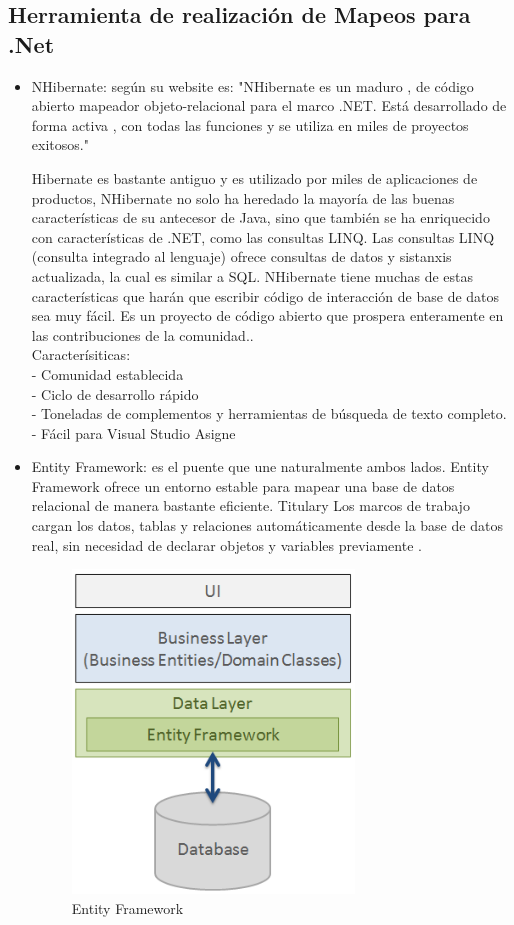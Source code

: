 \documentclass[preprint,12pt]{elsarticle}
\begin{document}
\subsection{\textbf{Herramienta de realización de Mapeos para .Net}}
\begin{itemize}
	\item NHibernate: según su website es: "NHibernate es un maduro , de código abierto mapeador objeto-relacional para el marco .NET. Está desarrollado de forma activa , con todas las funciones y se utiliza en miles de proyectos exitosos."\cite{nhibernate}

Hibernate es bastante antiguo y es utilizado por miles de aplicaciones de productos, NHibernate no solo ha heredado la mayoría de las buenas características de su antecesor de Java, sino que también se ha enriquecido con características de .NET, como las consultas LINQ. Las consultas LINQ (consulta integrado al lenguaje) ofrece consultas de datos y sistanxis actualizada, la cual es similar a SQL.
NHibernate tiene muchas de estas características que harán que escribir código de interacción de base de datos sea muy fácil. Es un proyecto de código abierto que prospera enteramente en las contribuciones de la comunidad..\cite{chatekar2015}\\
Caracterísiticas:\\
- Comunidad establecida\\
- Ciclo de desarrollo rápido\\
- Toneladas de complementos y herramientas de búsqueda de texto completo.\\
- Fácil para Visual Studio Asigne
	\item Entity Framework: es el puente que une naturalmente ambos lados. Entity Framework ofrece un entorno estable para mapear una base de datos relacional de manera bastante eficiente. Titulary Los marcos de trabajo cargan los datos, tablas y relaciones automáticamente desde la base de datos real, sin necesidad de declarar objetos y variables previamente .\cite {ef} \\

\begin{figure}[htb]
	\begin{center}
		\includegraphics[width=7.5cm]{./IMAGENES/ef} 
		\caption{Entity Framework}
	\end{center}
\end{figure}


\end{itemize}
\end{document}
